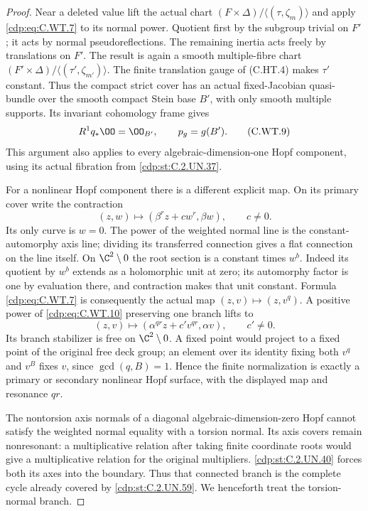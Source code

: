 \begin{proof}
Near a deleted value lift the actual chart
\((F\times\Delta)/\langle(\tau,\zeta_m)\rangle\)
and apply \eqref{cdp:eq:C.WT.7} to its normal power. Quotient
first by the subgroup trivial on \(F'\); it
acts by normal pseudoreflections. The remaining
inertia acts freely by translations on \(F'\).
The result is again a smooth multiple-fibre
chart
\((F'\times\Delta)/\langle(\tau',\zeta_{m'})\rangle\).
The finite translation gauge of (C.HT.4) makes
\(\tau'\) constant. Thus the compact strict cover
has an actual fixed-Jacobian quasi-bundle over
the smooth compact Stein base \(B'\), with only
smooth multiple supports. Its invariant
cohomology frame gives
\[
                  R^1q_*\OO=\OO_{B'},\qquad
                         p_g=g(B').
 \tag{C.WT.9}\label{cdp:eq:C.WT.9}
\]
This argument also applies to every
algebraic-dimension-one Hopf component, using
its actual fibration from \ref{cdp:st:C.2.UN.37}.

For a nonlinear Hopf component there is a
different explicit map. On its primary cover
write the contraction
\[
                    (z,w)\longmapsto
                     (\beta^r z+c w^r,\beta w),
                 \qquad c\ne0 .
 \tag{C.WT.10}\label{cdp:eq:C.WT.10}
\]
Its only curve is \(w=0\). The power of the
weighted normal line is the constant-automorphy
axis line; dividing its transferred connection
gives a flat connection on the line itself.
On \(\C^2\setminus0\) the root section is a
constant times \(w^b\). Indeed its quotient
by \(w^b\) extends as a holomorphic unit at
zero; its automorphy factor is one by
evaluation there, and contraction makes that
unit constant. Formula \eqref{cdp:eq:C.WT.7} is consequently
the actual map \((z,v)\mapsto(z,v^q)\).
A positive power of \eqref{cdp:eq:C.WT.10} preserving one
branch lifts to
\[
                 (z,v)\longmapsto
                    (\alpha^{qr}z+c'v^{qr},\alpha v),
                     \qquad c'\ne0 .
 \tag{C.WT.11}\label{cdp:eq:C.WT.11}
\]
Its branch stabilizer is free on
\(\C^2\setminus0\). A fixed point would project
to a fixed point of the original free deck
group; an element over its identity fixing
both \(v^q\) and \(v^B\) fixes \(v\), since
\(\gcd(q,B)=1\). Hence the finite normalization
is exactly a primary or secondary nonlinear
Hopf surface, with the displayed map and
resonance \(qr\).

The nontorsion axis normals of a diagonal
algebraic-dimension-zero Hopf cannot satisfy
the weighted normal equality with a torsion
normal. Its axis covers remain nonresonant:
a multiplicative relation after taking finite
coordinate roots would give a multiplicative
relation for the original multipliers.
\ref{cdp:st:C.2.UN.40} forces both its axes into the boundary.
Thus that connected branch is the complete
cycle already covered by \ref{cdp:st:C.2.UN.59}. We henceforth
treat the torsion-normal branch.


\end{proof}
